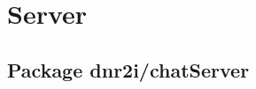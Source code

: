 \documentclass[a4paper,12pt]{report}
\begin{document}
  \chapter{Server}
    \section{Package dnr2i/chatServer}
      
      
      
      
\end{document}
